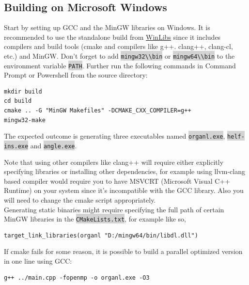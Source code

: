 \documentclass[11pt]{article}
\newcommand{\inlinecode}[1]{\colorbox{lightgray}{\lstinline[breaklines=true,basicstyle=\ttfamily]{#1}}}
\begin{document}
\subsection{Building on Microsoft Windows}
Start by setting up GCC and the MinGW libraries on Windows. It is recommended to use the standalone build from \href{https://winlibs.com/}{WinLibs} since it includes compilers and build tools (cmake and compilers like g++. clang++, clang-cl, etc.) and MinGW. Don't forget to add \inlinecode{mingw32\\bin} or \inlinecode{mingw64\\bin} to the environment variable \inlinecode{PATH}.
Further run the following commands in Command Prompt or Powershell from the source directory:
\begin{mdframed}[backgroundcolor=lightgray, linecolor=lightgray]
\begin{verbatim}
mkdir build
cd build
cmake .. -G "MinGW Makefiles" -DCMAKE_CXX_COMPILER=g++
mingw32-make
\end{verbatim}
\end{mdframed}
The expected outcome is generating three executables named \inlinecode{organl.exe}, \inlinecode{helf-} \inlinecode{ins.exe} and \inlinecode{angle.exe}. 

Note that using other compilers like clang++ will require either explicitly specifying libraries or installing other dependencies, for example using llvm-clang based compiler would require you to have MSVCRT (Microsoft Visual C++ Runtime) on your system since it's incompatible with the GCC library. Also you will need to change the cmake script appropriately. \\

Generating static binaries might require specifying the full path of certain MinGW libraries in the \inlinecode{CMakeLists.txt}, for example like so,
\begin{mdframed}[backgroundcolor=lightgray, linecolor=lightgray]
\begin{verbatim}
target_link_libraries(organl "D:/mingw64/bin/libdl.dll")
\end{verbatim}
\end{mdframed}
If cmake fails for some reason, it is possible to build a parallel optimized version in one line using GCC:
\begin{mdframed}[backgroundcolor=lightgray, linecolor=lightgray]
\begin{verbatim}
g++ ../main.cpp -fopenmp -o organl.exe -O3
\end{verbatim}
\end{mdframed}
\end{document}
